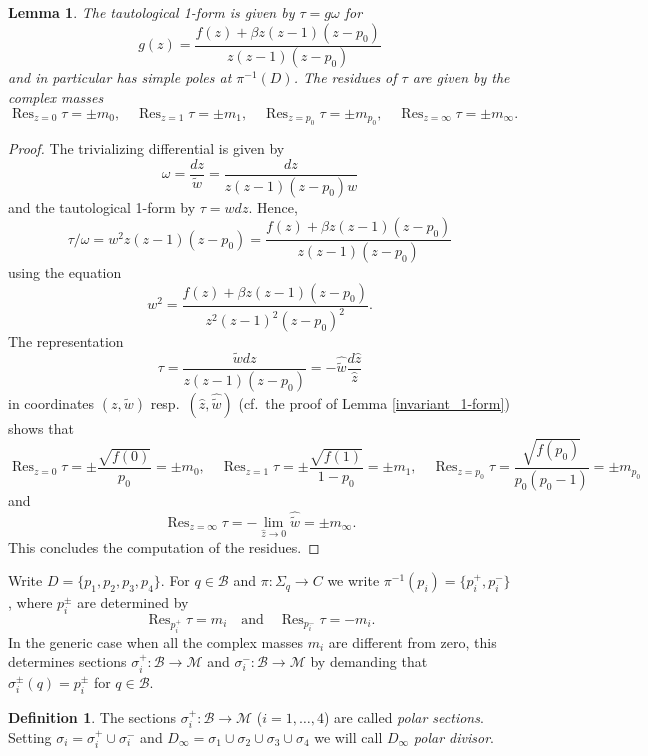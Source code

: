 \documentclass[12pt,letterpaper,reqno]{amsart}
\newtheorem{lem}[thm]{Lemma}
\theoremstyle{remark}
\theoremstyle{definition}
\newtheorem{defn}[thm]{Definition}
\numberwithin{thm}{section}
\numberwithin{equation}{section}
\numberwithin{figure}{section}
\DeclareMathOperator{\Res}{Res}
\begin{document}
\begin{lem}\label{residues}
The tautological 1-form is given by $\tau = g \omega$ for
\[
g(z) = \frac{f(z) + \beta z(z-1)(z-p_0)}{z(z-1)(z-p_0)}
\]	
and in particular has simple poles at $\pi^{-1}(D)$. The residues of $\tau$ are given by the complex masses
\[
\Res_{z=0} \tau = \pm m_0, \quad \Res_{z=1} \tau = \pm m_1, \quad \Res_{z=p_0} \tau = \pm m_{p_0}, \quad \Res_{z=\infty} \tau = \pm m_\infty. 
\]
\end{lem}

\begin{proof}
The trivializing differential is given by
\[
\omega =  \frac{dz}{ \tilde w} = \frac{dz}{ z (z-1)(z-p_0)w}
\]	
and the tautological 1-form by $\tau = w dz$. Hence,
\[
\tau/ \omega = w^2z(z-1)(z-p_0) = \frac{f(z) + \beta z(z-1)(z-p_0)}{z(z-1)(z-p_0)}
\]
using the equation
\begin{equation}\label{quadratic}
w^2  = \frac{f(z) + \beta z( z-1)(z-p_0)}{z^2(z-1)^2(z-p_0)^2}. 
\end{equation}
The representation \[
\tau = \frac{ \tilde w dz}{z(z-1)(z-p_0)} = - \hat{\tilde w} \frac{d \hat z}{\hat z}
\]
in coordinates $(z,\tilde w)$ resp.\ $(\hat z, \hat{\tilde w})$ (cf.\ the proof of Lemma \ref{invariant_1-form}) 
 shows that
 \[
 \Res_{z=0} \tau = \pm \frac{\sqrt{f(0)}}{p_0} = \pm m_0 , \quad  \Res_{z=1} \tau = \pm \frac{\sqrt{f(1)}}{1-p_0}=\pm m_1 , \quad \Res_{z=p_0} \tau = \frac{\sqrt{f(p_0)}}{p_0(p_0-1)}=\pm m_{p_0} 
 \]
 and 
 \[
 \Res_{z=\infty} \tau = - \lim_{\hat z \to 0} \hat{\tilde w} = \pm m_\infty.
 \]
 This concludes the computation of the residues.
\end{proof}

Write $D = \{p_1, p_2, p_3, p_4\}$. For $q \in \mathcal B$ and $\pi : \Sigma_q \to C$ we write $\pi^{-1}(p_i)=\{p_i^+,p_i^-\}$, where
$p_i^\pm$ are determined by
\[
\operatorname{Res}_{p_i^+ }\tau =  m_i  \quad \text{and} \quad \operatorname{Res}_{p_i^-} \tau = -m_i .
\]
In the generic case when all the complex masses $m_i$ are different from zero, this determines sections $\sigma_i^+ : \mathcal B \to \mathcal M$ and $\sigma_i^- : \mathcal B \to \mathcal M$
by demanding that $\sigma_i^{\pm}(q)= p_i^{\pm}$ for $q \in \mathcal B$.
\begin{defn}\label{def:polarsections}
The sections $\sigma_i^+ : \mathcal B \to \mathcal M$ ($i=1, \ldots, 4$) are called \emph{polar sections}. Setting $\sigma_i = \sigma_i^+ \cup \sigma_i^-$ and $D_\infty =\sigma_1 \cup \sigma_2 \cup \sigma_3 \cup \sigma_4$ we will call $D_\infty$ \emph{polar divisor}.
\end{defn}
\end{document}
